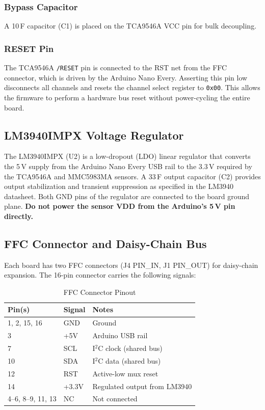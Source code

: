 \documentclass[12pt]{article}
\begin{document}
\subsubsection{Bypass Capacitor}

A 10\,\textmu F capacitor (C1) is placed on the TCA9546A VCC pin for
bulk decoupling.

\subsubsection{RESET Pin}

The TCA9546A \texttt{/RESET} pin is connected to the RST net from the FFC
connector, which is driven by the Arduino Nano Every. Asserting this pin
low disconnects all channels and resets the channel select register to
\texttt{0x00}. This allows the firmware to perform a hardware bus reset
without power-cycling the entire board.

\subsection{LM3940IMPX Voltage Regulator}

The LM3940IMPX (U2) is a low-dropout (LDO) linear regulator that converts
the 5\,V supply from the Arduino Nano Every USB rail to the 3.3\,V required
by the TCA9546A and MMC5983MA sensors. A 33\,\textmu F output capacitor
(C2) provides output stabilization and transient suppression as specified
in the LM3940 datasheet. Both GND pins of the regulator are connected to
the board ground plane. \textbf{Do not power the sensor VDD from the
Arduino's 5\,V pin directly.}

\subsection{FFC Connector and Daisy-Chain Bus}

Each board has two FFC connectors (J4 PIN\_IN, J1 PIN\_OUT) for daisy-chain
expansion. The 16-pin connector carries the following signals:

\begin{table}[H]
  \centering
  \caption{FFC Connector Pinout}
  \begin{tabular}{lll}
    \toprule
    \textbf{Pin(s)} & \textbf{Signal} & \textbf{Notes} \\
    \midrule
    1, 2, 15, 16 & GND       & Ground \\
    3            & +5V       & Arduino USB rail \\
    7            & SCL       & I$^2$C clock (shared bus) \\
    10           & SDA       & I$^2$C data (shared bus) \\
    12           & RST       & Active-low mux reset \\
    14           & +3.3V     & Regulated output from LM3940 \\
    4--6, 8--9, 11, 13 & NC  & Not connected \\
    \bottomrule
  \end{tabular}
  \label{tab:ffc_pins}
\end{table}
\end{document}
